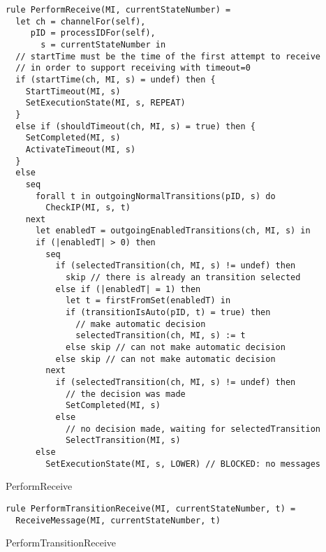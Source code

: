 \begin{listing}[H]
\begin{verbatim}
rule PerformReceive(MI, currentStateNumber) =
  let ch = channelFor(self),
     pID = processIDFor(self),
       s = currentStateNumber in
  // startTime must be the time of the first attempt to receive
  // in order to support receiving with timeout=0
  if (startTime(ch, MI, s) = undef) then {
    StartTimeout(MI, s)
    SetExecutionState(MI, s, REPEAT)
  }
  else if (shouldTimeout(ch, MI, s) = true) then {
    SetCompleted(MI, s)
    ActivateTimeout(MI, s)
  }
  else
    seq
      forall t in outgoingNormalTransitions(pID, s) do
        CheckIP(MI, s, t)
    next
      let enabledT = outgoingEnabledTransitions(ch, MI, s) in
      if (|enabledT| > 0) then
        seq
          if (selectedTransition(ch, MI, s) != undef) then
            skip // there is already an transition selected
          else if (|enabledT| = 1) then
            let t = firstFromSet(enabledT) in
            if (transitionIsAuto(pID, t) = true) then
              // make automatic decision
              selectedTransition(ch, MI, s) := t
            else skip // can not make automatic decision
          else skip // can not make automatic decision
        next
          if (selectedTransition(ch, MI, s) != undef) then
            // the decision was made
            SetCompleted(MI, s)
          else
            // no decision made, waiting for selectedTransition
            SelectTransition(MI, s)
      else
        SetExecutionState(MI, s, LOWER) // BLOCKED: no messages
\end{verbatim}
\caption{PerformReceive}
\label{lst:asm:PerformReceive}
\end{listing}


\begin{listing}[H]
\begin{verbatim}
rule PerformTransitionReceive(MI, currentStateNumber, t) =
  ReceiveMessage(MI, currentStateNumber, t)
\end{verbatim}
\caption{PerformTransitionReceive}
\label{lst:asm:PerformTransitionReceive}
\end{listing}




